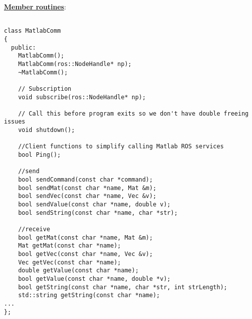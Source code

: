 \documentclass[letterpaper,notitlepage,11pt]{article}
\begin{document}
\textbf{\underline{Member routines}}:

\begin{verbatim}

class MatlabComm
{
  public:
    MatlabComm();
    MatlabComm(ros::NodeHandle* np);
    ~MatlabComm();

    // Subscription
    void subscribe(ros::NodeHandle* np);

    // Call this before program exits so we don't have double freeing issues
    void shutdown();
    
    //Client functions to simplify calling Matlab ROS services
    bool Ping();
    
    //send
    bool sendCommand(const char *command);
    bool sendMat(const char *name, Mat &m);
    bool sendVec(const char *name, Vec &v);
    bool sendValue(const char *name, double v);
    bool sendString(const char *name, char *str);

    //receive
    bool getMat(const char *name, Mat &m);
    Mat getMat(const char *name);
    bool getVec(const char *name, Vec &v);
    Vec getVec(const char *name);
    double getValue(const char *name);
    bool getValue(const char *name, double *v);
    bool getString(const char *name, char *str, int strLength);
    std::string getString(const char *name);
...
};
\end{verbatim}


%

\end{document}
